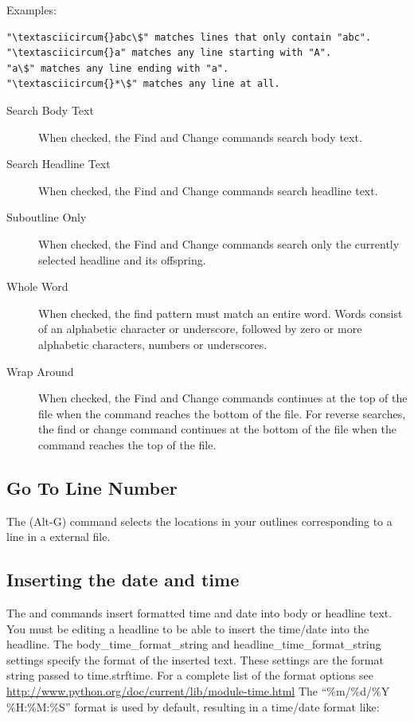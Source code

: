 \documentclass[a4paper,10pt,english]{sphinxmanual}
\begin{document}
Examples:

\begin{Verbatim}[commandchars=\\\{\}]
"\textasciicircum{}abc\$" matches lines that only contain "abc".
"\textasciicircum{}a" matches any line starting with "A".
"a\$" matches any line ending with "a".
"\textasciicircum{}*\$" matches any line at all.
\end{Verbatim}
\begin{description}
\item[{Search Body Text}] \leavevmode
When checked, the Find and Change commands search body text.

\item[{Search Headline Text}] \leavevmode
When checked, the Find and Change commands search headline text.

\item[{Suboutline Only}] \leavevmode
When checked, the Find and Change commands search only the currently
selected headline and its offspring.

\item[{Whole Word}] \leavevmode
When checked, the find pattern must match an entire word. Words consist
of an alphabetic character or underscore, followed by zero or more
alphabetic characters, numbers or underscores.

\item[{Wrap Around}] \leavevmode
When checked, the Find and Change commands continues at the top of the
file when the command reaches the bottom of the file. For reverse
searches, the find or change command continues at the bottom of the
file when the command reaches the top of the file.

\end{description}


\subsection{Go To Line Number}
\label{commands:go-to-line-number}
The  (Alt-G) command selects the locations in your
outlines corresponding to a line in a external file.


\subsection{Inserting the date and time}
\label{commands:inserting-the-date-and-time}
The  and  commands insert
formatted time and date into body or headline text. You must be editing a
headline to be able to insert the time/date into the headline. The
body\_time\_format\_string and headline\_time\_format\_string settings specify
the format of the inserted text. These settings are the format string
passed to time.strftime. For a complete list of the format options see
\href{http://www.python.org/doc/current/lib/module-time.html}{http://www.python.org/doc/current/lib/module-time.html} The ``\%m/\%d/\%Y
\%H:\%M:\%S'' format is used by default, resulting in a time/date format like:
\end{document}
